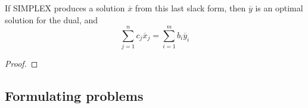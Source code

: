\begin{itemize}
If SIMPLEX produces a solution $\overline{x}$ from this last slack
form, then $\overline{y}$ is an optimal solution for the dual, and
$$
  \sum_{j=1}^n c_j \overline{x}_j = \sum_{i=1}^m b_i \overline{y}_i
$$
\begin{proof}
\end{proof}
\end{itemize}

\subsection{Formulating problems}

